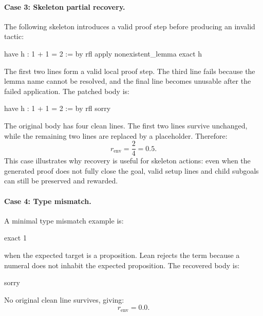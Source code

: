 \paragraph{Case 3: Skeleton partial recovery.}
The following skeleton introduces a valid proof step before producing an invalid tactic:
\begin{leanblock}
have h : 1 + 1 = 2 := by
  rfl
apply nonexistent_lemma
exact h
\end{leanblock}
The first two lines form a valid local proof step. The third line fails because the
lemma name cannot be resolved, and the final line becomes unusable after the failed application. The
patched body is:
\begin{leanblock}
have h : 1 + 1 = 2 := by
  rfl
sorry
\end{leanblock}
The original body has four clean lines. The first two lines survive unchanged, while the remaining two
lines are replaced by a placeholder. Therefore:
\[
r_{\text{env}} = \frac{2}{4} = 0.5.
\]
This case illustrates why recovery is useful for skeleton actions: even when the generated proof does not
fully close the goal, valid setup lines and child subgoals can still be preserved and rewarded.

\paragraph{Case 4: Type mismatch.}
A minimal type mismatch example is:
\begin{leanblock}
exact 1
\end{leanblock}
when the expected target is a proposition. Lean rejects the term because a numeral does not inhabit the
expected proposition. The recovered body is:
\begin{leanblock}
sorry
\end{leanblock}
No original clean line survives, giving:
\[
r_{\text{env}} = 0.0.
\]
